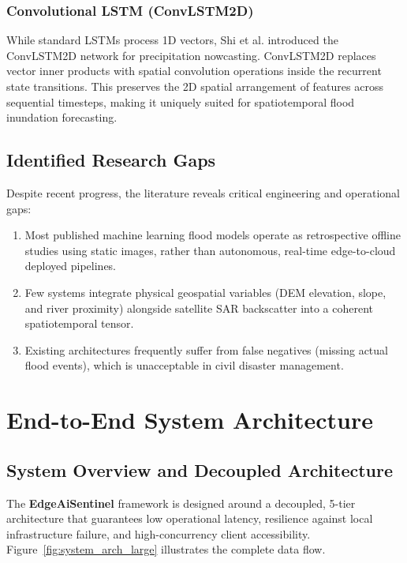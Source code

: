 \documentclass[12pt,a4paper,oneside]{report}
\begin{document}
\subsection{Convolutional LSTM (ConvLSTM2D)}
While standard LSTMs process 1D vectors, Shi et al. introduced the ConvLSTM2D network for precipitation nowcasting. ConvLSTM2D replaces vector inner products with spatial convolution operations inside the recurrent state transitions. This preserves the 2D spatial arrangement of features across sequential timesteps, making it uniquely suited for spatiotemporal flood inundation forecasting.

\section{Identified Research Gaps}
Despite recent progress, the literature reveals critical engineering and operational gaps:
\begin{enumerate}
    \item Most published machine learning flood models operate as retrospective offline studies using static images, rather than autonomous, real-time edge-to-cloud deployed pipelines.
    \item Few systems integrate physical geospatial variables (DEM elevation, slope, and river proximity) alongside satellite SAR backscatter into a coherent spatiotemporal tensor.
    \item Existing architectures frequently suffer from false negatives (missing actual flood events), which is unacceptable in civil disaster management.
\end{enumerate}

\chapter{End-to-End System Architecture}
\label{chap:system_arch}

\section{System Overview and Decoupled Architecture}
The \textbf{EdgeAiSentinel} framework is designed around a decoupled, 5-tier architecture that guarantees low operational latency, resilience against local infrastructure failure, and high-concurrency client accessibility. Figure~\ref{fig:system_arch_large} illustrates the complete data flow.
\end{document}
